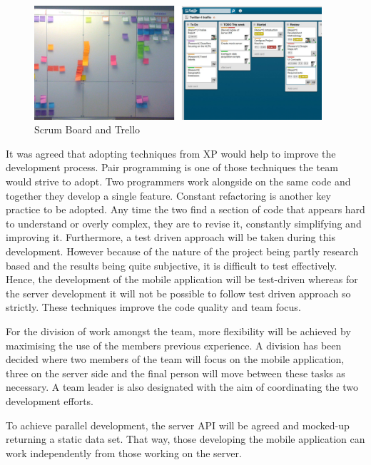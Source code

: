 \begin{figure}[here]
\begin{minipage}{\textwidth}  
\begin{center}
\includegraphics[width=0.95\textwidth]{images/scrumboard.jpg}
\end{center}
\vspace{-20pt}
\caption[Caption for LOF]{Scrum Board and Trello\footnotemark}
\end{minipage} 
\end{figure}

It was agreed that adopting techniques from XP would help to
improve the development process. Pair programming is one of those techniques the team would strive to adopt.
Two programmers work alongside on the same code and together they develop a single feature. Constant refactoring is another key practice to be adopted. Any
time the two find a section of code that appears hard to understand or overly
complex, they are to revise it, constantly simplifying and improving it. Furthermore, a test driven approach will be taken during this development.
However because of the nature of the project being partly research based and
the results being quite subjective, it is difficult to test effectively. Hence,
the development of the mobile application will be test-driven whereas for the
server development it will not be possible to follow test driven approach so strictly\cite{Cockburn}. These techniques improve the code quality and team focus.

For the division of work amongst the team, more flexibility will be achieved by maximising the use of the members previous experience. A division has been decided where two members of the team will focus on the mobile application, three on the server side and the final person will move between these tasks as necessary. A team leader is also designated with the aim of coordinating the two development efforts.  

To achieve parallel development, the server API will be agreed and mocked-up returning a static data set. That way, those developing the mobile application can work independently from those working on the server.

